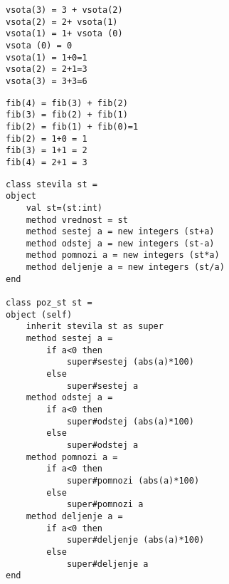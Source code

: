 \begin{Odgovor}{3.29}
\begin{lstlisting}
vsota(3) = 3 + vsota(2)
vsota(2) = 2+ vsota(1)
vsota(1) = 1+ vsota (0)
vsota (0) = 0
vsota(1) = 1+0=1
vsota(2) = 2+1=3
vsota(3) = 3+3=6
\end{lstlisting}
\end{Odgovor}
\begin{Odgovor}{3.30}
\begin{lstlisting}
fib(4) = fib(3) + fib(2)
fib(3) = fib(2) + fib(1)
fib(2) = fib(1) + fib(0)=1
fib(2) = 1+0 = 1
fib(3) = 1+1 = 2
fib(4) = 2+1 = 3
\end{lstlisting}
\end{Odgovor}
\begin{Odgovor}{4.1}
\begin{lstlisting}
class stevila st =
object
    val st=(st:int)
    method vrednost = st
    method sestej a = new integers (st+a)
    method odstej a = new integers (st-a)
    method pomnozi a = new integers (st*a)
    method deljenje a = new integers (st/a)
end

class poz_st st =
object (self)
    inherit stevila st as super
    method sestej a =
        if a<0 then
            super#sestej (abs(a)*100)
        else
            super#sestej a
    method odstej a =
        if a<0 then
            super#odstej (abs(a)*100)
        else
            super#odstej a
    method pomnozi a =
        if a<0 then
            super#pomnozi (abs(a)*100)
        else
            super#pomnozi a
    method deljenje a =
        if a<0 then
            super#deljenje (abs(a)*100)
        else
            super#deljenje a
end
\end{lstlisting}
\end{Odgovor}
